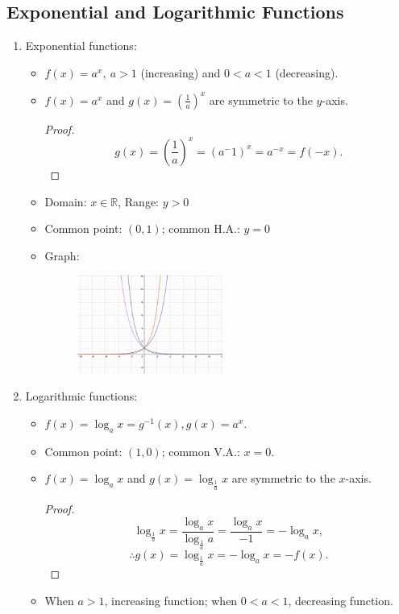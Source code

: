 \documentclass[12pt, a4paper]{article}
\newtheorem{proof}{Proof}[subsection]
\def\R{{\mathbb{R}}}
\begin{document}
\subsection{Exponential and Logarithmic Functions}
\begin{enumerate}
    \item Exponential functions: 
    \begin{itemize}
        \item $f(x)=a^x,\ a>1$ (increasing) and $0<a<1$ (decreasing). 
        \item $f(x)=a^x$ and $g(x)=\displaystyle\left(\frac{1}{a}\right)^x$ are symmetric to the $y$-axis. 
        \begin{proof}
            $$g(x)=\left(\frac{1}{a}\right)^x=(a^-1)^x=a^{-x}=f(-x).$$
        \end{proof}
        \item Domain: $x\in\R$, Range: $y>0$
        \item Common point: $(0, 1)$; common H.A.: $y=0$
        \item Graph: 
        \begin{figure}[H]
            \centering
            \includegraphics[width=0.48\textwidth]{Fig.2.12.jpg}
        \end{figure}
    \end{itemize}
    \item Logarithmic functions: 
    \begin{itemize}
        \item $f(x)=\log_a{x}=g^{-1}(x), g(x)=a^x$.
        \item Common point: $(1,0)$; common V.A.: $x=0$.
        \item $f(x)=\log_a{x}$ and $g(x)=\log_{\frac{1}{a}}{x}$ are symmetric to the $x$-axis.
        \begin{proof}
            $$\log_{\frac{1}{a}}{x}=\frac{\log_a{x}}{\log_\frac{1}{a}a}=\frac{\log_ax}{-1}=-\log_ax,$$
            $$\therefore g(x)=\log_\frac{1}{a}x=-\log_ax=-f(x).$$
        \end{proof}
        \item When $a>1$, increasing function; when $0<a<1$, decreasing function. 

\end{itemize}
\end{enumerate}
\end{document}
